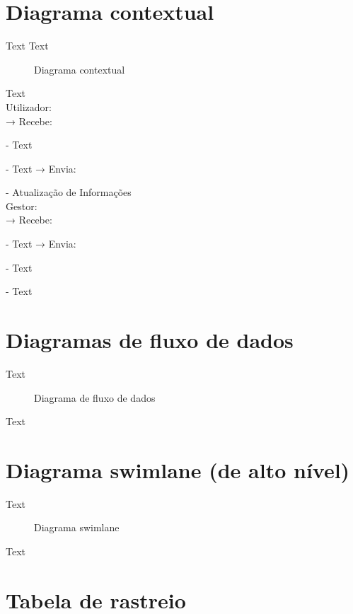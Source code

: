 \documentclass{scrreprt}
\begin{document}
\section{Diagrama contextual}

Text
\newline
Text
\begin{figure}[H]
    \centering
    \caption{Diagrama contextual}
    \label{fig:diagrama contextual}
\end{figure}
Text \\
\newline
Utilizador: \\
\newline
→ Recebe:

- Text

- Text
\newline
→ Envia:

- Atualização de Informações \\
\newline
Gestor: \\
\newline
→ Recebe:

- Text
\newline
→ Envia:

- Text

- Text

\section{Diagramas de fluxo de dados}

Text
\begin{figure}[H]
    \centering
    \caption{Diagrama de fluxo de dados}
    \label{fig:diagrama de fluxo de dados}
\end{figure}
Text

\section{Diagrama swimlane (de alto nível)}

Text
\begin{figure}[H]
    \centering
    \caption{Diagrama swimlane}
    \label{fig:diagrama swimlane}
\end{figure}
Text

\section{Tabela de rastreio}
\end{document}
